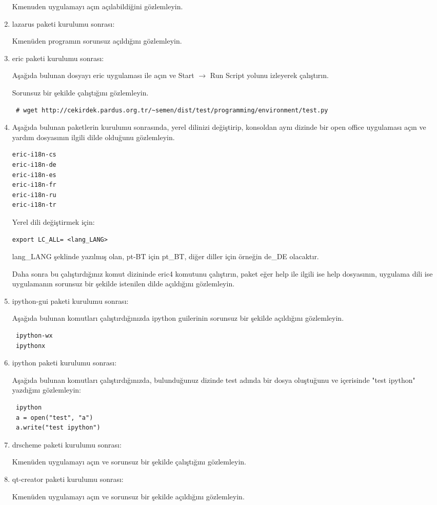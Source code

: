 \documentclass[a4paper,10pt]{article}
\begin{document}
\begin{enumerate}
Kmenuden uygulamayı açın açılabildiğini gözlemleyin.

 \item lazarus paketi kurulumu sonrası:

Kmenüden programın sorunsuz açıldığını gözlemleyin.

 \item eric paketi kurulumu sonrası:
 
Aşağıda bulunan dosyayı eric uygulaması ile açın ve Start $\rightarrow$ Run Script yolunu izleyerek çalıştırın. 

Sorunsuz bir şekilde çalıştığını gözlemleyin.
\begin{verbatim}
 # wget http://cekirdek.pardus.org.tr/~semen/dist/test/programming/environment/test.py
\end{verbatim}
 \item Aşağıda bulunan paketlerin kurulumu sonrasında, yerel dilinizi değiştirip, konsoldan aynı dizinde bir open office uygulaması açın ve yardım dosyasının ilgili dilde olduğunu gözlemleyin.
\begin{verbatim}
eric-i18n-cs
eric-i18n-de
eric-i18n-es
eric-i18n-fr
eric-i18n-ru
eric-i18n-tr
 \end{verbatim}

Yerel dili değiştirmek için:
\begin{verbatim}
export LC_ALL= <lang_LANG>
\end{verbatim}

lang\_LANG şeklinde yazılmış olan, pt-BT için pt\_BT, diğer diller için örneğin de\_DE olacaktır.

Daha sonra bu çalıştırdığınız komut dizininde eric4 komutunu çalıştırın, paket eğer help ile ilgili ise help dosyasının, uygulama dili ise uygulamanın sorunsuz bir şekilde istenilen dilde açıldığını gözlemleyin.

\item ipython-gui paketi kurulumu sonrası:

Aşağıda bulunan komutları çalıştırdığınızda ipython guilerinin sorunsuz bir şekilde açıldığını gözlemleyin.
\begin{verbatim}
 ipython-wx
 ipythonx
\end{verbatim}


\item ipython paketi kurulumu sonrası: 

Aşağıda bulunan komutları çalıştırdığınızda, bulunduğunuz dizinde test adında bir dosya oluştuğunu ve içerisinde "test ipython" yazdığını gözlemleyin:
\begin{verbatim}
 ipython
 a = open("test", "a")
 a.write("test ipython")
\end{verbatim}

\item drscheme paketi kurulumu sonrası:

Kmenüden uygulamayı açın ve sorunsuz bir şekilde çalıştığını gözlemleyin.

\item qt-creator paketi kurulumu sonrası:

Kmenüden uygulamayı açın ve sorunsuz bir şekilde açıldığını gözlemleyin.
\end{enumerate}
\end{document}
